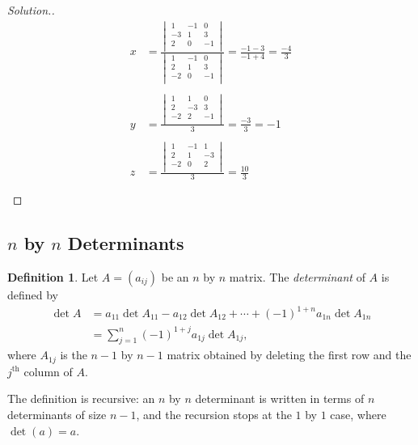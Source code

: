 \documentclass[11pt,a4paper]{article}
\theoremstyle{definition}
\newtheorem{defn}[thm]{Definition}
\newenvironment{solution}
  {\renewcommand{\qedsymbol}{}\begin{proof}[\textit{Solution}.]}
  {\end{proof}}
\begin{document}
\begin{solution}
\begin{align*}
x & =\frac{
\begin{vmatrix}
1&-1&0\\-3&1&3\\2&0&-1\\
\end{vmatrix}
}{
\begin{vmatrix}
1&-1&0\\2&1&3\\-2&0&-1\\
\end{vmatrix}
}=\frac{-1-3}{-1+4}=\frac{-4}{3}\\\\
y & =\frac{
\begin{vmatrix}
1&1&0\\2&-3&3\\-2&2&-1\\
\end{vmatrix}
}{3}=\frac{-3}{3}=-1\\\\
z &=\frac{
\begin{vmatrix}
1&-1&1\\2&1&-3\\-2&0&2\\
\end{vmatrix}
}{3}=\frac{10}{3}\\\\
\end{align*} 
\end{solution}
 
 
 
 
\subsection{$n$ by $n$ Determinants}
\begin{defn}
Let $A=(a_{ij})$ be an $n$ by $n$ matrix. The \emph{determinant} of $A$ is
defined by
\begin{align*}
\det A &=a_{11}\det A_{11}-a_{12}\det A_{12}+\cdots+(-1)^{1+n}a_{1n}\det A_{1n}\\
       &=\sum^n_{j=1}(-1)^{1+j}a_{1j}\det A_{1j},
\end{align*}
where $A_{1j}$ is the $n-1$ by $n-1$ matrix obtained by deleting the first row
and the $j^{\text{th}}$ column of $A$.

The definition is recursive: an $n$ by $n$ determinant is written in terms of
$n$ determinants of size $n-1$, and the recursion stops at the $1$ by $1$ case,
where $\det(a)=a$.
\end{defn}
\end{document}
